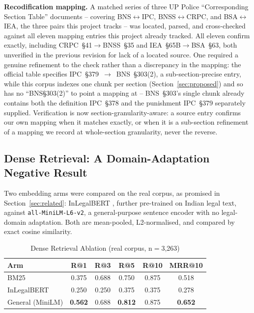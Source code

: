 \documentclass[conference]{IEEEtran}
\begin{document}
\textbf{Recodification mapping.} A matched series of three UP Police
``Corresponding Section Table'' documents -- covering BNS$\leftrightarrow$IPC,
BNSS$\leftrightarrow$CRPC, and BSA$\leftrightarrow$IEA, the three pairs this
project tracks -- was located, parsed, and cross-checked against all eleven
mapping entries this project already tracked. All eleven confirm exactly,
including CRPC~\S41$\rightarrow$BNSS~\S35 and IEA~\S65B$\rightarrow$BSA~\S63,
both unverified in the previous revision for lack of a located source. One
required a genuine refinement to the check rather than a discrepancy in the
mapping: the official table specifies IPC~\S379~$\rightarrow$~BNS~\S303(2), a
sub-section-precise entry, while this corpus indexes one chunk per section
(Section~\ref{sec:proposed}) and so has no ``BNS\S303(2)'' to point a mapping
at -- BNS~\S303's single chunk already contains both the definition IPC~\S378
and the punishment IPC~\S379 separately supplied. Verification is now
section-granularity-aware: a source entry confirms our own mapping when it
matches exactly, or when it is a sub-section refinement of a mapping we
record at whole-section granularity, never the reverse.

\subsection{Dense Retrieval: A Domain-Adaptation Negative Result}
\label{ssec:dense}

Two embedding arms were compared on the real corpus, as promised in
Section~\ref{sec:related}: InLegalBERT \cite{paul2023}, further pre-trained on
Indian legal text, against \texttt{all-MiniLM-L6-v2}, a general-purpose
sentence encoder with no legal-domain adaptation. Both are mean-pooled,
L2-normalised, and compared by exact cosine similarity.

\begin{table}[t]
\caption{Dense Retrieval Ablation (real corpus, n$=$3{,}263)}
\label{tab:dense}
\centering
\footnotesize
\begin{tabular}{@{}lccccc@{}}
\toprule
\textbf{Arm} & \textbf{R@1} & \textbf{R@3} & \textbf{R@5} & \textbf{R@10} & \textbf{MRR@10} \\
\midrule
BM25             & 0.375 & 0.688 & 0.750 & 0.875 & 0.518 \\
InLegalBERT      & 0.250 & 0.250 & 0.375 & 0.375 & 0.278 \\
General (MiniLM) & \textbf{0.562} & 0.688 & \textbf{0.812} & 0.875 & \textbf{0.652} \\
\bottomrule
\end{tabular}
\end{table}
\end{document}
